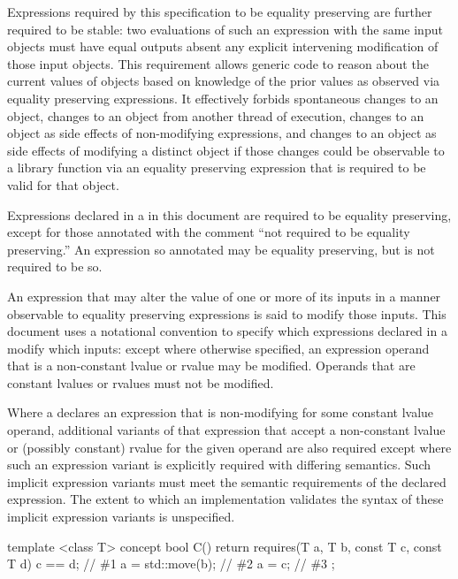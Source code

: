 \pnum
Expressions required by this specification to be equality preserving are
further required to be stable: two evaluations of such an expression with the same
input objects must have equal outputs absent any
explicit intervening modification of those input objects.
\enternote This requirement allows generic code to reason
about the current values of objects based on knowledge of the prior values as
observed via equality preserving expressions. It effectively forbids spontaneous
changes to an object, changes to an object from another thread of execution, changes
to an object as side effects of non-modifying expressions, and changes to an object as
side effects of modifying a distinct object if those changes could be observable
to a library function via an equality preserving expression that is required to be
valid for that object. \exitnote

\pnum
Expressions declared in a  in this document are
required to be equality preserving, except for those annotated with the comment
``not required to be equality preserving.'' An expression so annotated
may be equality preserving, but is not required to be so.

\pnum
An expression that may alter the value of one or more of its inputs in a manner
observable to equality preserving expressions is said to modify those inputs.
This document uses a notational convention to specify which expressions declared
in a  modify which inputs: except where otherwise
specified, an expression operand that is a non-constant lvalue or rvalue may be
modified. Operands that are constant lvalues or rvalues must not be modified.

\pnum
Where a  declares an expression that is non-modifying
for some constant lvalue operand, additional variants of that expression that accept
a non-constant lvalue or (possibly constant) rvalue for the given operand are also
required except where such an expression variant is explicitly required with
differing semantics. Such implicit expression variants must meet the semantic
requirements of the declared expression. The extent to which an implementation
validates the syntax of these implicit expression variants is unspecified.

\enterexample
\begin{codeblock}
template <class T>
concept bool C() {
  return requires(T a, T b, const T c, const T d) {
    c == d;           // \#1
    a = std::move(b); // \#2
    a = c;            // \#3
  };
}
\end{codeblock}


